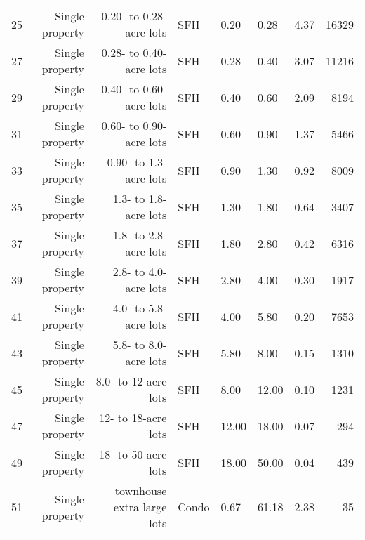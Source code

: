 \begin{tabular}{ p{0.5in} r r p{1in} p{0.75in} p{0.75in} rr}
        25 & Single property & 0.20- to 0.28-acre lots & SFH &       0.20 &       0.28 &       4.37 &      16329 \\

        27 & Single property & 0.28- to 0.40-acre lots & SFH &       0.28 &       0.40 &       3.07 &      11216 \\

        29 & Single property & 0.40- to 0.60-acre lots & SFH &       0.40 &       0.60 &       2.09 &       8194 \\

        31 & Single property & 0.60- to 0.90-acre lots & SFH &       0.60 &       0.90 &       1.37 &       5466 \\

        33 & Single property & 0.90- to 1.3-acre lots & SFH &       0.90 &       1.30 &       0.92 &       8009 \\

        35 & Single property & 1.3- to 1.8-acre lots & SFH &       1.30 &       1.80 &       0.64 &       3407 \\

        37 & Single property & 1.8- to 2.8-acre lots & SFH &       1.80 &       2.80 &       0.42 &       6316 \\

        39 & Single property & 2.8- to 4.0-acre lots & SFH &       2.80 &       4.00 &       0.30 &       1917 \\

        41 & Single property & 4.0- to 5.8-acre lots & SFH &       4.00 &       5.80 &       0.20 &       7653 \\

        43 & Single property & 5.8- to 8.0-acre lots & SFH &       5.80 &       8.00 &       0.15 &       1310 \\

        45 & Single property & 8.0- to 12-acre lots & SFH &       8.00 &      12.00 &       0.10 &       1231 \\

        47 & Single property & 12- to 18-acre lots & SFH &      12.00 &      18.00 &       0.07 &        294 \\

        49 & Single property & 18- to 50-acre lots & SFH &      18.00 &      50.00 &       0.04 &        439 \\

        51 & Single property & townhouse extra large lots & Condo &       0.67 &      61.18 &       2.38 &         35 \\


\end{tabular}
